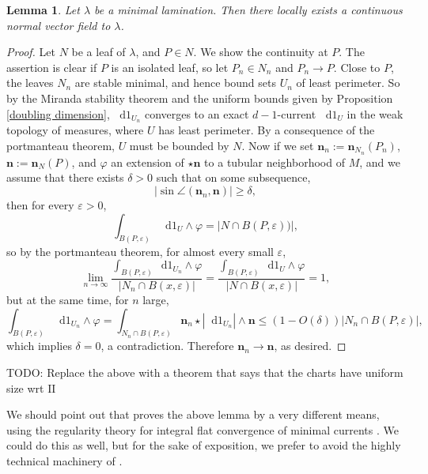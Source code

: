 \documentclass[reqno,11pt]{amsart}
\newcommand*\dif{\mathop{}\!\mathrm{d}}
\newcommand{\Two}{\mathrm{I\!I}}
\newcommand{\normal}{\mathbf n}
\newtheorem{lemma}[theorem]{Lemma}
\theoremstyle{definition}
\numberwithin{equation}{section}
\begin{document}
\begin{lemma}\label{lams have C0 fields}
Let $\lambda$ be a minimal lamination. Then there locally exists a continuous normal vector field to $\lambda$.
\end{lemma}
\begin{proof}
Let $N$ be a leaf of $\lambda$, and $P \in N$.
We show the continuity at $P$.
The assertion is clear if $P$ is an isolated leaf, so let $P_n \in N_n$ and $P_n \to P$.
Close to $P$, the leaves $N_n$ are stable minimal, and hence bound sets $U_n$ of least perimeter.
So by the Miranda stability theorem and the uniform bounds given by Proposition \ref{doubling dimension}, $\dif 1_{U_n}$ converges to an exact $d-1$-current $\dif 1_U$ in the weak topology of measures, where $U$ has least perimeter.
By a consequence of the portmanteau theorem, $U$ must be bounded by $N$.
Now if we set $\normal_n := \normal_{N_n}(P_n)$, $\normal := \normal_N(P)$, and $\varphi$ an extension of $\star \normal$ to a tubular neighborhood of $M$, and we assume that there exists $\delta > 0$ such that on some subsequence,
$$|\sin \angle(\normal_n, \normal)| \geq \delta,$$
then for every $\varepsilon > 0$,
$$\int_{B(P, \varepsilon)} \dif 1_U \wedge \varphi = |N \cap B(P, \varepsilon))|,$$
so by the portmanteau theorem, for almost every small $\varepsilon$,
$$\lim_{n \to \infty} \frac{\int_{B(P, \varepsilon)} \dif 1_{U_n} \wedge \varphi}{|N_n \cap B(x, \varepsilon)|} = \frac{\int_{B(P, \varepsilon)} \dif 1_U \wedge \varphi}{|N \cap B(x, \varepsilon)|} = 1,$$
but at the same time, for $n$ large,
$$\int_{B(P, \varepsilon)} \dif 1_{U_n} \wedge \varphi = \int_{N_n \cap B(P, \varepsilon)} \normal_n \star |\dif 1_{U_n}| \wedge \normal \leq (1 - O(\delta)) |N_n \cap B(P, \varepsilon)|,$$
which implies $\delta = 0$, a contradiction.
Therefore $\normal_n \to \normal$, as desired.
\end{proof}

TODO: Replace the above with a theorem that says that the charts have uniform size wrt $\Two$

We should point out that \cite{Solomon86} proves the above lemma by a very different means, using the regularity theory for integral flat convergence of minimal currents \cite[Theorem 5.3.14]{federer2014geometric}.
We could do this as well, but for the sake of exposition, we prefer to avoid the highly technical machinery of \cite[Chapter 5]{federer2014geometric}.
\end{document}

